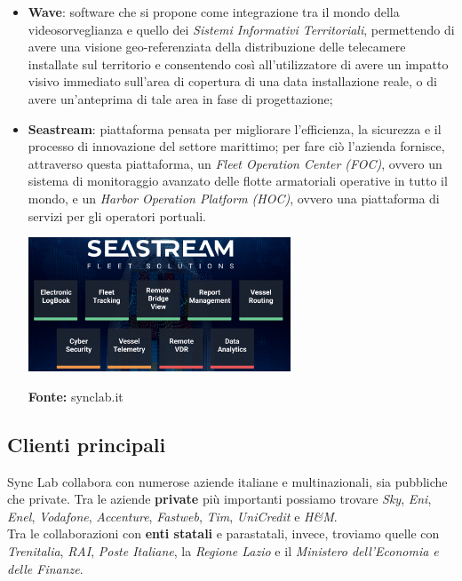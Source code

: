 \begin{itemize}
  \item \textbf{Wave}: software che si propone come integrazione tra il mondo della videosorveglianza e quello dei \textit{Sistemi Informativi Territoriali}, permettendo di avere una visione geo-referenziata della distribuzione delle telecamere installate sul territorio e consentendo così all'utilizzatore di avere un impatto visivo immediato sull'area di copertura di una data installazione reale, o di avere un'anteprima di tale area in fase di progettazione;

  \item \textbf{Seastream}: piattaforma pensata per migliorare l'efficienza, la sicurezza e il processo di innovazione del settore marittimo; per fare ciò l'azienda fornisce, attraverso questa piattaforma, un \textit{Fleet Operation Center (FOC)}, ovvero un sistema di monitoraggio avanzato delle flotte armatoriali operative in tutto il mondo, e un \textit{Harbor Operation Platform (HOC)}, ovvero una piattaforma di servizi per gli operatori portuali.

  \begin{minipage}{\linewidth}
    \centering
      \includegraphics[height=4cm]{immagini/seastream}
    \caption*{\textbf{Fonte:} synclab.it}
  \end{minipage}

\end{itemize}

\subsection*{Clienti principali}
Sync Lab collabora con numerose aziende italiane e multinazionali, sia pubbliche che private. Tra le aziende \textbf{private} più importanti possiamo trovare \textit{Sky}, \textit{Eni}, \textit{Enel}, \textit{Vodafone}, \textit{Accenture}, \textit{Fastweb}, \textit{Tim}, \textit{UniCredit} e \textit{H\&M}. \\
Tra le collaborazioni con \textbf{enti statali} e parastatali, invece, troviamo quelle con \textit{Trenitalia}, \textit{RAI}, \textit{Poste Italiane}, la \textit{Regione Lazio} e il \textit{Ministero dell'Economia e delle Finanze}.

